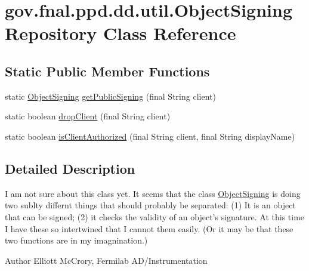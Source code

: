 \hypertarget{classgov_1_1fnal_1_1ppd_1_1dd_1_1util_1_1ObjectSigningRepository}{\section{gov.\-fnal.\-ppd.\-dd.\-util.\-Object\-Signing\-Repository Class Reference}
\label{classgov_1_1fnal_1_1ppd_1_1dd_1_1util_1_1ObjectSigningRepository}
}
\subsection*{Static Public Member Functions}
\begin{DoxyCompactItemize}
\item 
static \hyperlink{classgov_1_1fnal_1_1ppd_1_1dd_1_1util_1_1ObjectSigning}{Object\-Signing} \hyperlink{classgov_1_1fnal_1_1ppd_1_1dd_1_1util_1_1ObjectSigningRepository_a0206d457f5c293cb672b6b955887667e}{get\-Public\-Signing} (final String client)
\item 
static boolean \hyperlink{classgov_1_1fnal_1_1ppd_1_1dd_1_1util_1_1ObjectSigningRepository_a3f82ee3ffd872658ae83e4e082d1b1a5}{drop\-Client} (final String client)
\item 
static boolean \hyperlink{classgov_1_1fnal_1_1ppd_1_1dd_1_1util_1_1ObjectSigningRepository_a92b52ed0e207527af50af4877afff94c}{is\-Client\-Authorized} (final String client, final String display\-Name)
\end{DoxyCompactItemize}


\subsection{Detailed Description}
I am not sure about this class yet. It seems that the class \hyperlink{classgov_1_1fnal_1_1ppd_1_1dd_1_1util_1_1ObjectSigning}{Object\-Signing} is doing two sublty differnt things that should probably be separated\-: (1) It is an object that can be signed; (2) it checks the validity of an object's signature. At this time I have these so intertwined that I cannot them easily. (Or it may be that these two functions are in my imagnination.)

\begin{DoxyAuthor}{Author}
Elliott Mc\-Crory, Fermilab A\-D/\-Instrumentation 
\end{DoxyAuthor}


